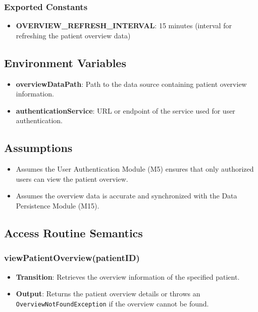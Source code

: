 \documentclass[12pt, titlepage]{article}
\begin{document}
\subsubsection{Exported Constants}
\begin{itemize}
\item \textbf{OVERVIEW\_REFRESH\_INTERVAL}: 15 minutes (interval for refreshing the patient overview data)
\end{itemize}

\subsection{Environment Variables}
\begin{itemize}
\item \textbf{overviewDataPath}: Path to the data source containing patient overview information.
\item \textbf{authenticationService}: URL or endpoint of the service used for user authentication.
\end{itemize}

\subsection{Assumptions}
\begin{itemize}
\item Assumes the User Authentication Module (M5) ensures that only authorized users can view the patient overview.
\item Assumes the overview data is accurate and synchronized with the Data Persistence Module (M15).
\end{itemize}

\subsection{Access Routine Semantics}
\subsubsection{viewPatientOverview(patientID)}
\begin{itemize}
    \item \textbf{Transition}: Retrieves the overview information of the specified patient.
    \item \textbf{Output}: Returns the patient overview details or throws an \texttt{OverviewNotFoundException} if the overview cannot be found.
\end{itemize}
\end{document}
